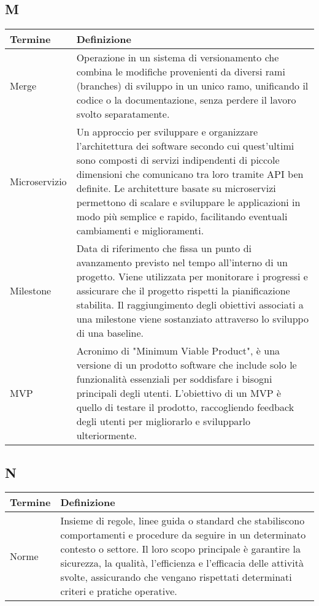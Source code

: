 \documentclass[10pt]{article}
\begin{document}
\subsection{M} %
\begin{longtable}{|>{\centering\arraybackslash}m{2.5cm}|>{\arraybackslash}m{12.5cm}|}
\hline
\rowcolor[gray]{0.8}
\textbf{Termine} & \textbf{Definizione}\\
\endhead
\hline
Merge & Operazione in un sistema di versionamento che combina le modifiche provenienti da diversi rami (branches) di sviluppo in un unico ramo, unificando il codice o la documentazione, senza perdere il lavoro svolto separatamente.\\
\hline
Microservizio & Un approccio per sviluppare e organizzare l’architettura dei software secondo cui quest’ultimi sono composti di servizi indipendenti di piccole dimensioni che comunicano tra loro tramite API ben definite. Le architetture basate su microservizi permettono di scalare e sviluppare le applicazioni in modo più semplice e rapido, facilitando eventuali cambiamenti e miglioramenti.\\
\hline
Milestone & Data di riferimento che fissa un punto di avanzamento previsto nel tempo all'interno di un progetto. Viene utilizzata per monitorare i progressi e assicurare che il progetto rispetti la pianificazione stabilita. Il raggiungimento degli obiettivi associati a una milestone viene sostanziato attraverso lo sviluppo di una baseline.\\
\hline
MVP & Acronimo di "Minimum Viable Product", è una versione di un prodotto software che include solo le funzionalità essenziali per soddisfare i bisogni principali degli utenti. L'obiettivo di un MVP è quello di testare il prodotto, raccogliendo feedback degli utenti per migliorarlo e svilupparlo ulteriormente.\\
\hline
\end{longtable}

\subsection{N} %
\begin{longtable}{|>{\centering\arraybackslash}m{2.5cm}|>{\arraybackslash}m{12.5cm}|}
\hline
\rowcolor[gray]{0.8}
\textbf{Termine} & \textbf{Definizione}\\
\endhead
\hline
Norme & Insieme di regole, linee guida o standard che stabiliscono comportamenti e procedure da seguire in un determinato contesto o settore. Il loro scopo principale è garantire la sicurezza, la qualità, l'efficienza e l'efficacia delle attività svolte, assicurando che vengano rispettati determinati criteri e pratiche operative.\\
\hline
\end{longtable}
\end{document}
